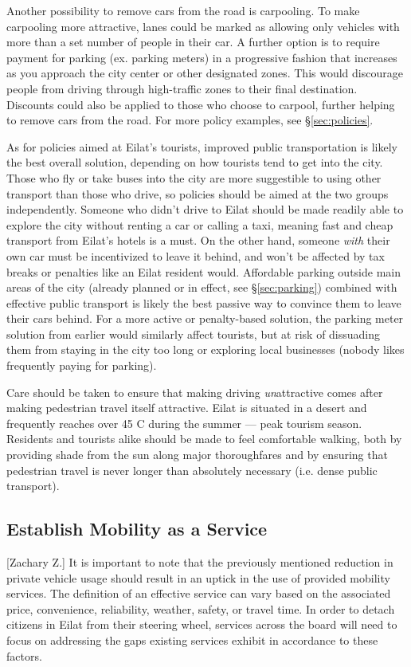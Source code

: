 \documentclass[12pt]{article}                               %
\begin{document}
Another possibility to remove cars from the road is carpooling. To make carpooling more attractive, lanes could be marked as allowing only vehicles with more than a set number of people in their car. A further option is to require payment for parking (ex. parking meters) in a progressive fashion that increases as you approach the city center or other designated zones. This would discourage people from driving through high-traffic zones to their final destination. Discounts could also be applied to those who choose to carpool, further helping to remove cars from the road. For more policy examples, see \S\ref{sec:policies}.

As for policies aimed at Eilat's tourists, improved public transportation is likely the best overall solution, depending on how tourists tend to get into the city. Those who fly or take buses into the city are more suggestible to using other transport than those who drive, so policies should be aimed at the two groups independently. Someone who didn't drive to Eilat should be made readily able to explore the city without renting a car or calling a taxi, meaning fast and cheap transport from Eilat's hotels is a must. On the other hand, someone \textit{with} their own car must be incentivized to leave it behind, and won't be affected by tax breaks or penalties like an Eilat resident would. Affordable parking outside main areas of the city (already planned or in effect, see \S\ref{sec:parking}) combined with effective public transport is likely the best passive way to convince them to leave their cars behind. For a more active or penalty-based solution, the parking meter solution from earlier would similarly affect tourists, but at risk of dissuading them from staying in the city too long or exploring local businesses (nobody likes frequently paying for parking).

Care should be taken to ensure that making driving \textit{un}attractive comes after making pedestrian travel itself attractive. Eilat is situated in a desert and frequently reaches over 45\textdegree{} C during the summer --- peak tourism season. Residents and tourists alike should be made to feel comfortable walking, both by providing shade from the sun along major thoroughfares and by ensuring that pedestrian travel is never longer than absolutely necessary (i.e. dense public transport).

\subsection{Establish Mobility as a Service}[Zachary Z.]    
It is important to note that the previously mentioned reduction in private vehicle usage should result in an uptick in the use of provided mobility services. The definition of an effective service can vary based on the associated price, convenience, reliability, weather, safety, or travel time. In order to detach citizens in Eilat from their steering wheel, services across the board will need to focus on addressing the gaps existing services exhibit in accordance to these factors. 
\end{document}
